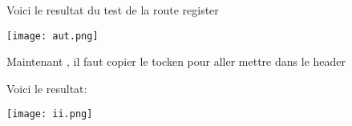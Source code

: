 \documentclass{article}
\begin{document}
 \vspace{1cm}
    Voici le resultat du test de la route register
    \begin{center} 
    \texttt{[image: aut.png]} 
\end{center}
    \vspace{1cm}




Maintenant , il faut copier le tocken pour aller mettre dans le header


    Voici le resultat:
    \begin{center} 
    \texttt{[image: ii.png]} 
\end{center}
    \vspace{1cm}
\end{document}
